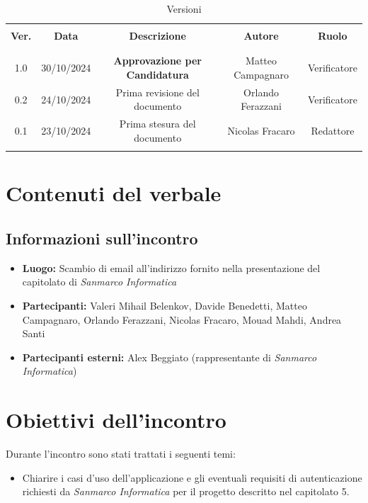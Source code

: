 \documentclass[italian, 12pt]{article}
\begin{document}
\pagestyle{mystyle}


\begin{table}[!h]
	\caption{Versioni}
	\begin{center}
		\begin{tabular}{ c c c c c}
			\hline \\[-2ex]
			\textbf{Ver.} & \textbf{Data} & \textbf{Descrizione} & \textbf{Autore} & \textbf{Ruolo}  \\
			\\[-2ex] \hline \\[-1.5ex]
            1.0 & 30/10/2024 & \textbf{Approvazione per Candidatura} & Matteo Campagnaro & Verificatore\\
			0.2 & 24/10/2024 & Prima revisione del documento & Orlando Ferazzani & Verificatore \\
			0.1 & 23/10/2024 & Prima stesura del documento & Nicolas Fracaro & Redattore\\
			\\[-1.5ex] \hline
		\end{tabular}
	\end{center}
\end{table}


\tableofcontents
\newpage

\section{Contenuti del verbale}

\subsection{Informazioni sull'incontro}
\begin{itemize}
    \item \textbf{Luogo:} Scambio di email all'indirizzo fornito nella presentazione del capitolato di \textit{Sanmarco Informatica}
    \item \textbf{Partecipanti:} Valeri Mihail Belenkov, Davide Benedetti, Matteo Campagnaro, Orlando Ferazzani, Nicolas Fracaro, Mouad Mahdi, Andrea Santi
    \item \textbf{Partecipanti esterni:} Alex Beggiato (rappresentante di \textit{Sanmarco Informatica})
\end{itemize}

\section{Obiettivi dell'incontro}
Durante l'incontro sono stati trattati i seguenti temi:
\begin{itemize}
    \item Chiarire i casi d'uso dell'applicazione e gli eventuali requisiti di autenticazione richiesti da \textit{Sanmarco Informatica} per il progetto descritto nel capitolato 5.
\end{itemize}
\end{document}
